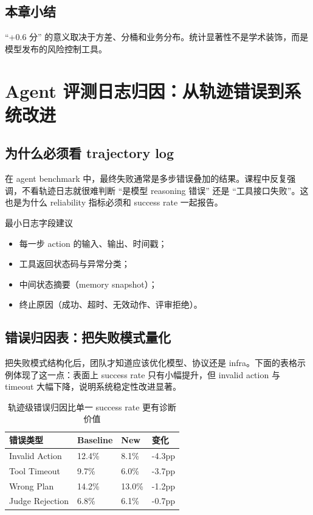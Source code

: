 \documentclass[a4paper]{article}
\begin{document}
\subsection{本章小结}
``+0.6 分'' 的意义取决于方差、分桶和业务分布。统计显著性不是学术装饰，而是模型发布的风险控制工具。

\section{Agent 评测日志归因：从轨迹错误到系统改进}

\subsection{为什么必须看 trajectory log}
在 agent benchmark 中，最终失败通常是多步错误叠加的结果。课程中反复强调，不看轨迹日志就很难判断 ``是模型 reasoning 错误'' 还是 ``工具接口失败''。这也是为什么 reliability 指标必须和 success rate 一起报告。

\begin{knowledgebox}{最小日志字段建议}
\begin{itemize}
    \item 每一步 action 的输入、输出、时间戳；
    \item 工具返回状态码与异常分类；
    \item 中间状态摘要（memory snapshot）；
    \item 终止原因（成功、超时、无效动作、评审拒绝）。
\end{itemize}
\end{knowledgebox}

\subsection{错误归因表：把失败模式量化}
把失败模式结构化后，团队才知道应该优化模型、协议还是 infra。下面的表格示例体现了这一点：表面上 success rate 只有小幅提升，但 invalid action 与 timeout 大幅下降，说明系统稳定性改进显著。

\begin{table}[H]
\centering
\begin{tabular}{p{3.0cm}p{2.5cm}p{2.5cm}p{2.5cm}}
\toprule
\textbf{错误类型} & \textbf{Baseline} & \textbf{New} & \textbf{变化} \\
\midrule
Invalid Action & 12.4\% & 8.1\% & -4.3pp \\
Tool Timeout & 9.7\% & 6.0\% & -3.7pp \\
Wrong Plan & 14.2\% & 13.0\% & -1.2pp \\
Judge Rejection & 6.8\% & 6.1\% & -0.7pp \\
\bottomrule
\end{tabular}
\caption{轨迹级错误归因比单一 success rate 更有诊断价值}
\end{table}
\end{document}
